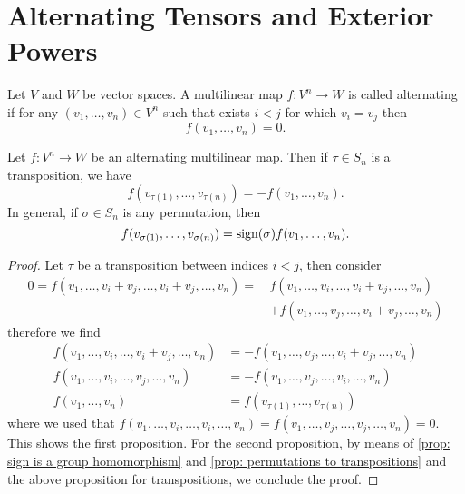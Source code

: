 \section{Alternating Tensors and Exterior Powers}

\begin{definition}
  \label{def: alternating map}
  Let \(V\) and \(W\) be vector spaces. A multilinear map \(f: V^n \to W\) is
  called alternating if for any \((v_1, \dots, v_n) \in V^n\) such that exists \(i
  < j\) for which \(v_i = v_j\) then
  \[
    f(v_1, \dots, v_n) = 0.
  \]
\end{definition}

\begin{proposition}\label{prop: alternating map property}
  Let \(f: V^n \to W\) be an alternating multilinear map. Then if \(\tau \in
  S_n\) is a transposition, we have
  \[
    f(v_{\tau(1)}, \dots, v_{\tau(n)}) = - f(v_1, \dots, v_n).
  \]
  In general, if \(\sigma \in S_n\) is any permutation, then
  \[
    f(v_{\sigma(1)}, \dots, v_{\sigma(n)}) = \operatorname{sign}(\sigma) f(v_1,
    \dots, v_n).
  \]
\end{proposition}

\begin{proof}
  Let \(\tau\) be a transposition between indices \(i < j\), then consider
  \begin{align*}
    0 = f(v_1, \dots, v_i + v_j, \dots, v_i + v_j, \dots, v_n)
    =\, & f(v_1, \dots, v_i, \dots, v_i + v_j, \dots, v_n) \\
      & + f(v_1, \dots, v_j, \dots, v_i + v_j, \dots, v_n)
  \end{align*}
  therefore we find
  \begin{align*}
    f(v_1, \dots, v_i, \dots, v_i + v_j, \dots, v_n)
    &= - f(v_1, \dots, v_j, \dots, v_i + v_j, \dots, v_n) \\
    f(v_1, \dots, v_i, \dots, v_j, \dots, v_n)
    &= - f(v_1, \dots, v_j, \dots, v_i, \dots, v_n) \\
    f(v_1, \dots, v_n)
    &= f(v_{\tau(1)}, \dots, v_{\tau(n)})
  \end{align*}
  where we used that \(f(v_1, \dots, v_i, \dots, v_i, \dots, v_n) = f(v_1,
  \dots, v_j, \dots, v_j, \dots, v_n) = 0\). This shows the first proposition.
  For the second proposition, by means of \cref{prop: sign is a group
  homomorphism} and \cref{prop: permutations to transpositions} and the above
  proposition for transpositions, we conclude the proof.
\end{proof}

